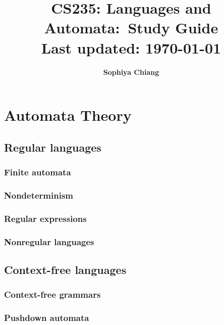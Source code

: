 \documentclass[11pt]{article}
\newcommand{\hmwkTitle}{Study Guide}
\newcommand{\hmwkClass}{CS235: Languages and Automata}
\newcommand{\hmwkAuthorName}{\textbf{Sophiya Chiang}}
\begin{document}
 

\title{
    \vspace{2in}
    \textmd{\textbf{\hmwkClass:\ \hmwkTitle}}\\
    \normalsize\vspace{0.1in}\small{Last updated: \today}\\
    \vspace{3in}
}

\author{\hmwkAuthorName}
\date{}

\maketitle

\pagebreak

\tableofcontents

\pagebreak

\section{Automata Theory}
\subsection{Regular languages}
\subsubsection{Finite automata}


\subsubsection{Nondeterminism}
\subsubsection{Regular expressions}
\subsubsection{Nonregular languages}

\subsection{Context-free languages}
\subsubsection{Context-free grammars}
\subsubsection{Pushdown automata}
\end{document}
